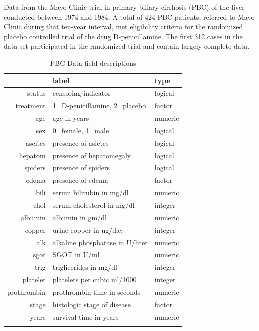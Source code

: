 \documentclass[nojss]{jss}\usepackage[]{graphicx}\usepackage[]{color}
\begin{document}
Data from the Mayo Clinic trial in primary biliary cirrhosis (PBC) of the liver conducted between 1974 and 1984. A total of 424 PBC patients, referred to Mayo Clinic during that ten-year interval, met eligibility criteria for the randomized placebo controlled trial of the drug D-penicillamine. The first 312 cases in the data set participated in the randomized trial and contain largely complete data.



\begin{table}[ht]
\centering
{\footnotesize
\begin{tabular}{rll}
  \toprule
 & label & type \\ 
  \midrule
status & censoring indicator & logical \\ 
   \rowcolor[gray]{0.95}treatment & 1=D-penicillamine, 2=placebo & factor \\ 
  age & age in years & numeric \\ 
   \rowcolor[gray]{0.95}sex & 0=female, 1=male & logical \\ 
  ascites & presence of asictes & logical \\ 
   \rowcolor[gray]{0.95}hepatom & presence of hepatomegaly & logical \\ 
  spiders & presence of spiders & logical \\ 
   \rowcolor[gray]{0.95}edema & presence of edema & factor \\ 
  bili & serum bilirubin in mg/dl & numeric \\ 
   \rowcolor[gray]{0.95}chol & serum cholesterol in mg/dl & integer \\ 
  albumin & albumin in gm/dl & numeric \\ 
   \rowcolor[gray]{0.95}copper & urine copper in ug/day & integer \\ 
  alk & alkaline phosphatase in U/liter & numeric \\ 
   \rowcolor[gray]{0.95}sgot & SGOT in U/ml & numeric \\ 
  trig & triglicerides in mg/dl & integer \\ 
   \rowcolor[gray]{0.95}platelet & platelets per cubic ml/1000 & integer \\ 
  prothrombin & prothrombin time in seconds & numeric \\ 
   \rowcolor[gray]{0.95}stage & histologic stage of disease & factor \\ 
  years & survival time in years & numeric \\ 
   \rowcolor[gray]{0.95} \bottomrule
\end{tabular}
}
\caption{PBC Data field descriptions} 
\label{T:dataLabs}
\end{table}
\end{document}
